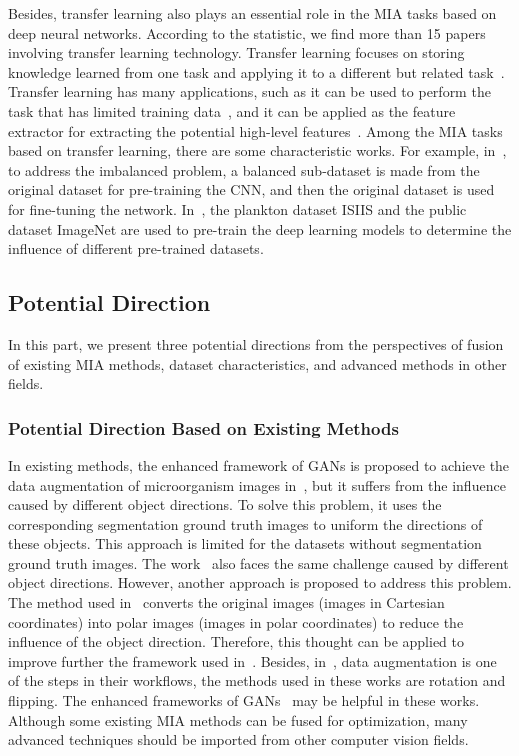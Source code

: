 Besides, transfer learning also plays an essential role in the MIA tasks based on deep neural networks. According to the statistic, we find more than 15 papers involving transfer learning technology. Transfer learning focuses on storing knowledge learned from one task and applying it to a different but related task~\cite{West-2007-SRPA,Doodfellow-2016-DL}. Transfer learning has many applications, such as it can be used to perform the task that has limited training data~\cite{Zhang-2020-AMCF}, and it can be applied as the feature extractor for extracting the potential high-level features~\cite{Wang-2018-TPCN}. Among the MIA tasks based on transfer learning, there are some characteristic works. For example, in~\cite{Lee-2016-PCIL}, to address the imbalanced problem, a balanced sub-dataset is made from the original dataset for pre-training the CNN, and then the original dataset is used for fine-tuning the network. In~\cite{Rodrigues-2018-ETLS}, the plankton dataset ISIIS and the public dataset ImageNet are used to pre-train the deep learning models to determine the influence of different pre-trained datasets. 

\subsection{Potential Direction}
\label{PD}

In this part, we present three potential directions from the perspectives of fusion of existing MIA methods, dataset characteristics, and advanced methods in other fields.

\subsubsection{Potential Direction Based on Existing Methods}

In existing methods, the enhanced framework of GANs is proposed to achieve the data augmentation of microorganism images in~\cite{Xu-2020-AEFG}, but it suffers from the influence caused by different object directions. To solve this problem, it uses the corresponding segmentation ground truth images to uniform the directions of these objects. This approach is limited for the datasets without segmentation ground truth images. The work~\cite{Cheng-2020-MTCN} also faces the same challenge caused by different object directions. However, another approach is proposed to address this problem. The method used in~\cite{Cheng-2020-MTCN} converts the original images (images in Cartesian coordinates) into polar images (images in polar coordinates) to reduce the influence of the object direction. Therefore, this thought can be applied to improve further the framework used in~\cite{Xu-2020-AEFG}. Besides, in~\cite{Pedraza-2017-ADCA,Li-2020-MAMR,Zhang-2020-AMCF}, data augmentation is one of the steps in their workflows, the methods used in these works are rotation and flipping. The enhanced frameworks of GANs~\cite{Xu-2020-AEFG,Xu-2020-MIAU} may be helpful in these works. Although some existing MIA methods can be fused for optimization, many advanced techniques should be imported from other computer vision fields.

